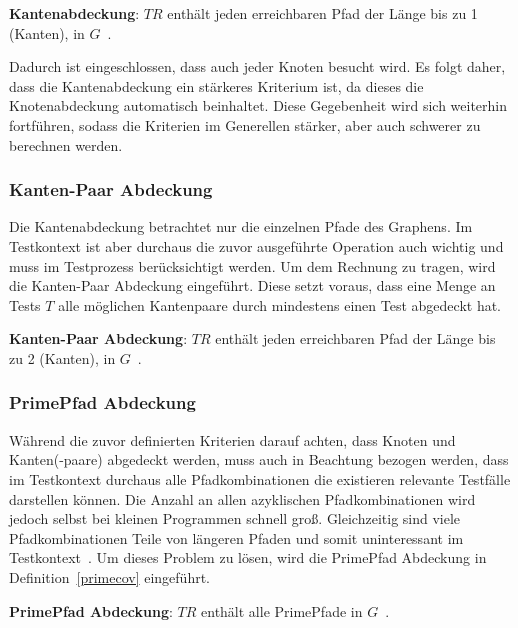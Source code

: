 \begin{definition}
    \textbf{Kantenabdeckung}: $TR$ enthält jeden erreichbaren Pfad der Länge bis zu 1 (Kanten), in $G$~\cite[vgl. Criterion 2.2]{software-testing}.
    \label{edgecov}
\end{definition}

Dadurch ist eingeschlossen, dass auch jeder Knoten besucht wird.
Es folgt daher, dass die Kantenabdeckung ein stärkeres Kriterium ist, da dieses die Knotenabdeckung automatisch beinhaltet.
Diese Gegebenheit wird sich weiterhin fortführen, sodass die Kriterien im Generellen stärker, aber auch schwerer zu berechnen werden.

\subsubsection{Kanten-Paar Abdeckung}

Die Kantenabdeckung betrachtet nur die einzelnen Pfade des Graphens.
Im Testkontext ist aber durchaus die zuvor ausgeführte Operation auch wichtig und muss im Testprozess berücksichtigt werden.
Um dem Rechnung zu tragen, wird die Kanten-Paar Abdeckung eingeführt.
Diese setzt voraus, dass eine Menge an Tests $T$ alle möglichen Kantenpaare durch mindestens einen Test abgedeckt hat.

\begin{definition}
    \textbf{Kanten-Paar Abdeckung}: $TR$ enthält jeden erreichbaren Pfad der Länge bis zu 2 (Kanten), in $G$~\cite[vgl. Criterion 2.3]{software-testing}.
    \label{edgepaircov}
\end{definition}

\subsubsection{PrimePfad Abdeckung}

Während die zuvor definierten Kriterien darauf achten, dass Knoten und Kanten(-paare) abgedeckt werden, muss auch in Beachtung
bezogen werden, dass im Testkontext durchaus alle Pfadkombinationen die existieren relevante Testfälle darstellen können.
Die Anzahl an allen azyklischen Pfadkombinationen wird jedoch selbst bei kleinen Programmen schnell groß\cite[vgl. S. 35]{software-testing}.
Gleichzeitig sind viele Pfadkombinationen Teile von längeren Pfaden und somit uninteressant im Testkontext~\cite[vgl. S. 35]{software-testing}.
Um dieses Problem zu lösen, wird die PrimePfad Abdeckung in Definition~\ref{primecov} eingeführt.

\begin{definition}
    \textbf{PrimePfad Abdeckung}: $TR$ enthält alle PrimePfade in $G$~\cite[vgl. Criterion 2.4]{software-testing}.
    \label{primecov}
\end{definition}

